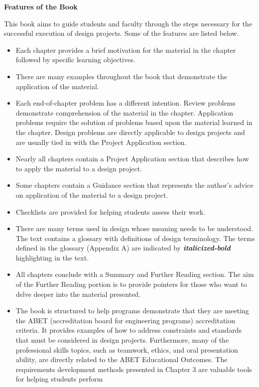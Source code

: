 \textbf{Features of the Book}

This book aims to guide students and faculty through the steps necessary
for the successful execution of design projects. Some of the features
are listed below.

\begin{itemize}
\item
  Each chapter provides a brief motivation for the material in the
  chapter followed by specific learning objectives.
\item
  There are many examples throughout the book that demonstrate the
  application of the material.
\item
  Each end-of-chapter problem has a different intention. Review problems
  demonstrate comprehension of the material in the chapter. Application
  problems require the solution of problems based upon the material
  learned in the chapter. Design problems are directly applicable to
  design projects and are usually tied in with the Project Application
  section.
\item
  Nearly all chapters contain a Project Application section that
  describes how to apply the material to a design project.
\item
  Some chapters contain a Guidance section that represents the author's
  advice on application of the material to a design project.
\item
  Checklists are provided for helping students assess their work.
\item
  There are many terms used in design whose meaning needs to be
  understood. The text contains a glossary with definitions of design
  terminology. The terms defined in the glossary (Appendix A) are
  indicated by \emph{\textbf{italicized-bold}} highlighting in the text.
\item
  All chapters conclude with a Summary and Further Reading section. The
  aim of the Further Reading portion is to provide pointers for those
  who want to delve deeper into the material presented.
\item
  The book is structured to help programs demonstrate that they are
  meeting the ABET (accreditation board for engineering programs)
  accreditation criteria. It provides examples of how to address
  constraints and standards that must be considered in design projects.
  Furthermore, many of the professional skills topics, such as teamwork,
  ethics, and oral presentation ability, are directly related to the
  ABET Educational Outcomes. The requirements development methods
  presented in Chapter 3 are valuable tools for helping students perform

\end{itemize}

